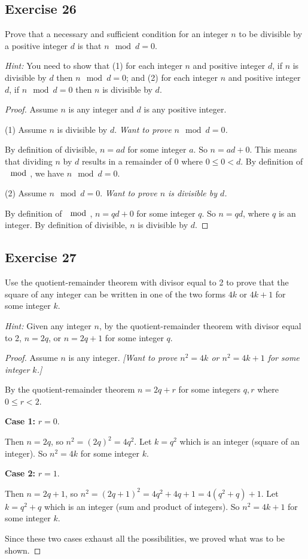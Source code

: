\documentclass[14pt]{extarticle}
\begin{document}
\subsection{Exercise 26}
Prove that a necessary and sufficient condition for an integer $n$ to be divisible by a positive integer $d$ is that $n \mod d = 0$.

    {\it Hint:} You need to show that (1) for each integer $n$ and positive integer $d$, if $n$ is divisible by $d$ then $n \mod d = 0$; and (2) for each integer $n$ and positive integer $d$, if $n \mod d = 0$ then $n$ is divisible by $d$.

\begin{proof}
    Assume $n$ is any integer and $d$ is any positive integer.

    (1) Assume $n$ is divisible by $d$. {\it Want to prove $n \mod d = 0$.}

    By definition of divisible, $n = ad$ for some integer $a$. So $n = ad + 0$. This means that dividing $n$ by $d$ results in a remainder of $0$ where $0 \leq 0 < d$. By definition of $\mod$, we have $n \mod d = 0$.

    (2) Assume $n \mod d = 0$. {\it Want to prove $n$ is divisible by $d$.}

    By definition of $\mod$, $n = qd + 0$ for some integer $q$. So $n = qd$, where $q$ is an integer. By definition of divisible, $n$ is divisible by $d$.
\end{proof}

\subsection{Exercise 27}
Use the quotient-remainder theorem with divisor equal to 2 to prove that the square of any integer can be written in one of the two forms $4k$ or $4k + 1$ for some integer $k$.

    {\it Hint:} Given any integer $n$, by the quotient-remainder theorem with divisor equal to 2, $n = 2q$, or $n = 2q + 1$ for some integer $q$.

\begin{proof}
    Assume $n$ is any integer. {\it [Want to prove $n^2 = 4k$ or $n^2 = 4k+1$ for some integer $k$.]}

    By the quotient-remainder theorem $n = 2q+r$ for some integers $q, r$ where $0 \leq r < 2$.

        {\bf Case 1:} $r = 0$.

    Then $n = 2q$, so $n^2 = (2q)^2 = 4q^2$. Let $k = q^2$ which is an integer (square of an integer). So $n^2 = 4k$ for some integer $k$.

        {\bf Case 2:} $r = 1$.

    Then $n = 2q+1$, so $n^2 = (2q+1)^2 = 4q^2+4q+1 = 4(q^2+q)+1$. Let $k = q^2+q$ which is an integer (sum and product of integers). So $n^2 = 4k+1$ for some integer $k$.

    Since these two cases exhaust all the possibilities, we proved what was to be shown.
\end{proof}
\end{document}
